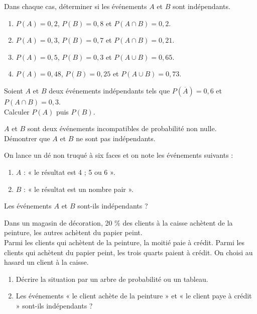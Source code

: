 \documentclass[a4paper,11pt,exos]{nsi} %
\begin{document}
\maketitle

\exo{}
Dans chaque cas, déterminer si les événements $A$ et $B$ sont indépendants.
\begin{enumerate}
    \item $P(A)=0,2$, $P(B)=0,8$ et $P(A\cap B)=0,2$.
    \item $P(A)=0,3$, $P(B)=0,7$ et $P(A\cap B)=0,21$.
    \item $P(A)=0,5$, $P(B)=0,3$ et $P(A\cup B)=0,65$.
    \item $P(A)=0,48$, $P(B)=0,25$ et $P(A\cup B)=0,73$.
\end{enumerate}



\exo{}
Soient $A$ et $B$ deux événements indépendants tels que $P(\overline{A})=0,6$ et $P(A\cap B)=0,3$.\\
Calculer $P(A)$ puis $P(B)$.



\exo{ \faStar}
$A$ et $B$ sont deux événements incompatibles de probabilité non nulle.\\
Démontrer que $A$ et $B$ ne sont pas indépendants.



\exo{}
On lance un dé non truqué à six faces et on note les événements suivants :
\begin{enumerate}[label=\textbullet]
    \item $A$ : « le résultat est 4 ; 5 ou 6 ».
    \item $B$ : « le résultat est un nombre pair ».
\end{enumerate}
Les événements $A$ et $B$ sont-ils indépendants ?



\exo{}
Dans un magasin de décoration, 20 \% des clients à la caisse achètent de la peinture, les autres achètent du papier peint.\\
Parmi les clients qui achètent de la peinture, la moitié paie à crédit. Parmi les clients qui achètent du papier peint, les trois quarts paient à crédit.
On choisi au hasard un client à la caisse.
\begin{enumerate}
    \item Décrire la situation par un arbre de probabilité ou un tableau.
    \item Les événements « le client achète de la peinture » et « le client paye à crédit » sont-ils indépendants ?
\end{enumerate}
\end{document}
